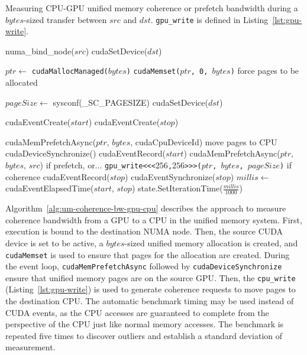 \begin{algorithm}[H]
	\caption[Measuring CPU-GPU unified memory coherence or prefetch bandwidth]{
		Measuring CPU-GPU unified memory coherence or prefetch bandwidth during a $bytes$-sized transfer between $src$ and $dst$.
		\texttt{gpu\_write} is defined in Listing~\ref{lst:gpu-write}.
	}
	\label{alg:um-bw-cpu-gpu}
	\begin{algorithmic}[1]
		\Statex
		
		\State numa\_bind\_node($src$)
		\State cudaSetDevice($dst$)

		\State $ptr \gets$ \texttt{cudaMallocManaged($bytes$)}
		\State \texttt{cudaMemset($ptr$, 0, $bytes$)} \Comment force pages to be allocated

		\State $pageSize \gets$ sysconf(\_SC\_PAGESIZE)
		\State cudaSetDevice($dst$)

		\State cudaEventCreate($start$)
		\State cudaEventCreate($stop$)		        
				
			\State cudaMemPrefetchAsync($ptr$, $bytes$, cudaCpuDeviceId) \Comment move pages to CPU
			\State cudaDeviceSynchronize()
			\State cudaEventRecord($start$)
			\State cudaMemPrefetchAsync($ptr$, $bytes$, $src$) \Comment if prefetch, or...
			\State \texttt{gpu\_write<<<$256$,$256$>>>($ptr$, $bytes$, $pageSize$)} \Comment if coherence
			\State cudaEventRecord($stop$)
			\State cudaEventSynchronize($stop$)
			\State $millis \gets$ cudaEventElapsedTime($start$, $stop$)
			\State state.SetIterationTime($\frac{millis}{1000}$)
		\EndFor
		\EndFunction			
	\end{algorithmic}
\end{algorithm}

Algorithm~\ref{alg:um-coherence-bw-gpu-cpu} describes the approach to measure coherence bandwidth from a GPU to a CPU in the unified memory system.
First, execution is bound to the destination NUMA node.
Then, the source CUDA device is set to be active, a $bytes$-sized unified memory allocation is created, and \texttt{cudaMemset} is used to ensure that pages for the allocation are created.
During the event loop, \texttt{cudaMemPrefetchAsync} followed by \texttt{cudaDeviceSynchronize} ensure that unified memory pages are on the source GPU.
Then, the \texttt{cpu\_write} (Listing~\ref{lst:gpu-write}) is used to generate coherence requests to move pages to the destination CPU.
The automatic benchmark timing may be used instead of CUDA events, as the CPU accesses are guaranteed to complete from the perspective of the CPU just like normal memory accesses.
The benchmark is repeated five times to discover outliers and establish a standard deviation of measurement.

